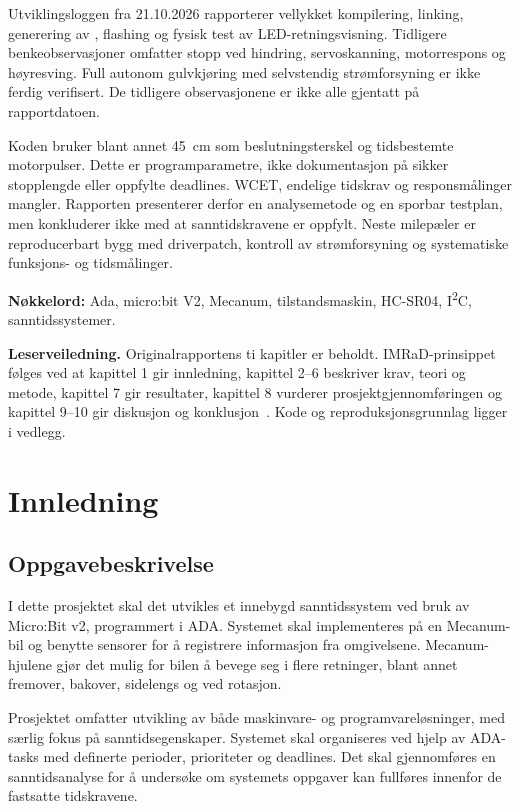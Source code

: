\documentclass[a4paper,11pt,oneside]{report}
\newcommand{\kode}[1]{\begingroup
 \sbox0{\texttt{\detokenize{#1}}}%
 \ifdim\wd0>150pt\relax
  {\urlstyle{tt}\expandafter\nolinkurl\expandafter{\detokenize{#1}}}%
 \else\usebox0\fi\endgroup}
\begin{document}
Utviklingsloggen fra 21.10.2026 rapporterer vellykket kompilering, linking,
generering av \kode{main.hex}, flashing og fysisk test av LED-retningsvisning.
Tidligere benkeobservasjoner omfatter stopp ved hindring, servoskanning,
motorrespons og høyresving. Full autonom gulvkjøring med selvstendig
strømforsyning er ikke ferdig verifisert. De tidligere observasjonene er
ikke alle gjentatt på rapportdatoen.

Koden bruker blant annet 45~cm som beslutningsterskel og tidsbestemte
motorpulser. Dette er programparametre, ikke dokumentasjon på sikker
stopplengde eller oppfylte deadlines. WCET, endelige tidskrav og
responsmålinger mangler. Rapporten presenterer derfor en analysemetode
og en sporbar testplan, men konkluderer ikke med at sanntidskravene er oppfylt.
Neste milepæler er reproducerbart bygg med driverpatch, kontroll av
strømforsyning og systematiske funksjons- og tidsmålinger.

\vspace{6mm}
\textbf{Nøkkelord:} Ada, micro:bit V2, Mecanum, tilstandsmaskin,
HC-SR04, I\textsuperscript{2}C, sanntidssystemer.

\smallskip
\textbf{Leserveiledning.} Originalrapportens ti kapitler er beholdt.
IMRaD-prinsippet følges ved at kapittel 1 gir innledning, kapittel 2--6
beskriver krav, teori og metode, kapittel 7 gir resultater, kapittel 8
vurderer prosjektgjennomføringen og kapittel 9--10 gir diskusjon og
konklusjon~\cite{oppgave,imrad}. Kode og reproduksjonsgrunnlag ligger i vedlegg.

\clearpage
\tableofcontents
\clearpage
{}

\chapter{Innledning}\label{ch:intro}
\section{Oppgavebeskrivelse}
I dette prosjektet skal det utvikles et innebygd sanntidssystem ved bruk av
Micro:Bit v2, programmert i ADA. Systemet skal implementeres på en Mecanum-bil
og benytte sensorer for å registrere informasjon fra omgivelsene.
Mecanum-hjulene gjør det mulig for bilen å bevege seg i flere retninger,
blant annet fremover, bakover, sidelengs og ved rotasjon.

Prosjektet omfatter utvikling av både maskinvare- og programvareløsninger,
med særlig fokus på sanntidsegenskaper. Systemet skal organiseres ved hjelp av
ADA-tasks med definerte perioder, prioriteter og deadlines. Det skal
gjennomføres en sanntidsanalyse for å undersøke om systemets oppgaver kan
fullføres innenfor de fastsatte tidskravene.
\end{document}
